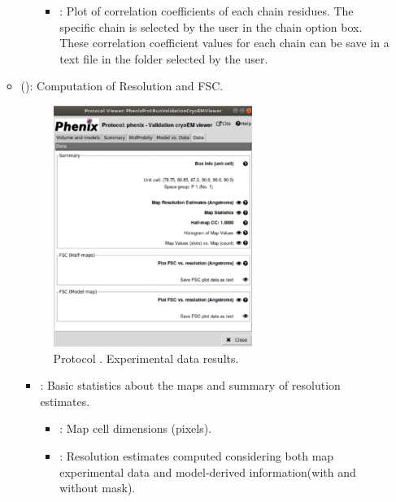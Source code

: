 \begin{itemize}
\begin{itemize}
\begin{itemize}
\begin{itemize}
           \item {}: Plot of correlation coefficients of each chain residues. The specific chain is selected by the user in the chain option box. These correlation coefficient values for each chain can be save in a text file in the folder selected by the user.
         \end{itemize}
        \end{itemize}
      \item {} (): Computation of Resolution  and FSC.
       \begin{figure}[H]
         \centering 
         \captionsetup{width=.7\linewidth} 
         \includegraphics[width=0.65\textwidth]{Images_appendix/Fig204.pdf}
         \caption{Protocol . Experimental data results.}
         \label{fig:validationCryoEM_protocol_6}
        \end{figure}
        \begin{itemize}
         \item {}: Basic statistics about the maps and summary of resolution estimates.
         \begin{itemize}
          \item {}: Map cell dimensions (pixels).
          \item {}: Resolution estimates computed considering both map experimental data and model-derived information(with and without mask)\setlength{\parindent}{12pt}.\\

\end{itemize}
\end{itemize}
\end{itemize}
\end{itemize}
